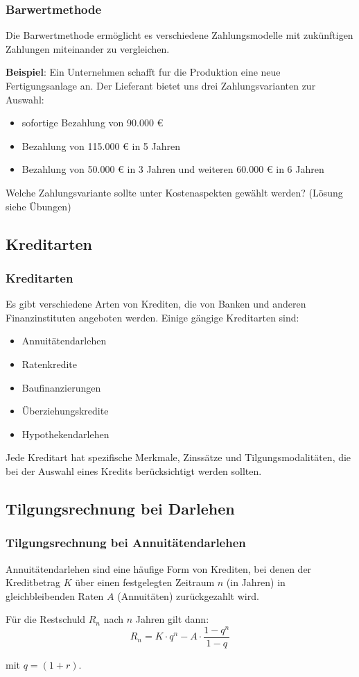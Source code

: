 \documentclass{beamer}
\begin{document}
\begin{frame}
    \frametitle{Barwertmethode}
    Die Barwertmethode ermöglicht es verschiedene Zahlungsmodelle mit zukünftigen Zahlungen miteinander zu vergleichen.

    \textbf{Beispiel}: Ein Unternehmen schafft fur die Produktion eine neue Fertigungsanlage an. Der
    Lieferant bietet uns drei Zahlungsvarianten zur Auswahl:
    \begin{itemize}
        \item sofortige Bezahlung von 90.000 €
        \item Bezahlung von 115.000 € in 5 Jahren
        \item Bezahlung von 50.000 € in 3 Jahren und weiteren 60.000 € in 6 Jahren
    \end{itemize}
    Welche Zahlungsvariante sollte unter Kostenaspekten gewählt werden? (Lösung siehe Übungen)
\end{frame}

\subsection{Kreditarten}
\begin{frame}
  \frametitle{Kreditarten}
  
  Es gibt verschiedene Arten von Krediten, die von Banken und anderen Finanzinstituten angeboten werden. Einige gängige Kreditarten sind:
  
  \begin{itemize}
    \item Annuitätendarlehen
    \item Ratenkredite
    \item Baufinanzierungen
    \item Überziehungskredite
    \item Hypothekendarlehen
  \end{itemize}
  
  Jede Kreditart hat spezifische Merkmale, Zinssätze und Tilgungsmodalitäten, die bei der Auswahl eines Kredits berücksichtigt werden sollten.
\end{frame}

\subsection{Tilgungsrechnung bei Darlehen}
\begin{frame}
  \frametitle{Tilgungsrechnung bei Annuitätendarlehen}
  
  Annuitätendarlehen sind eine häufige Form von Krediten, bei denen der Kreditbetrag $K$ über einen festgelegten Zeitraum $n$ (in Jahren) in gleichbleibenden Raten $A$ (Annuitäten) zurückgezahlt wird.

  \vspace{1cm}

  Für die Restschuld $R_n$ nach $n$ Jahren gilt dann: 
  $$R_n = K \cdot q^n - A \cdot \frac{1-q^n}{1-q}$$

  mit $q=(1+r)$.
\end{frame}
\end{document}
